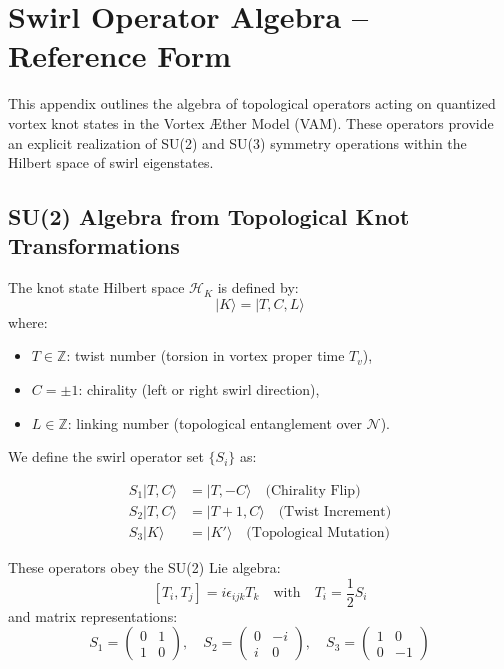 \documentclass[preprint]{revtex4-2}
\begin{document}
        \section{Swirl Operator Algebra – Reference Form}\label{sec:swirl_operator_algebra}
            This appendix outlines the algebra of topological operators acting on quantized vortex knot states in the Vortex \AE{}ther Model (VAM). These operators provide an explicit realization of SU(2) and SU(3) symmetry operations within the Hilbert space of swirl eigenstates.
        
            \subsection{SU(2) Algebra from Topological Knot Transformations}
        
            The knot state Hilbert space \( \mathcal{H}_K \) is defined by:
            \[
            |K\rangle = |T, C, L\rangle
            \]
            where:
            \begin{itemize}
                \item \( T \in \mathbb{Z} \): twist number (torsion in vortex proper time \( T_v \)),
                \item \( C = \pm 1 \): chirality (left or right swirl direction),
                \item \( L \in \mathbb{Z} \): linking number (topological entanglement over \( \mathcal{N} \)).
            \end{itemize}
        
            We define the swirl operator set \( \{S_i\} \) as:
        
            \begin{align}
            S_1 |T, C\rangle &= |T, -C\rangle \quad \text{(Chirality Flip)} \\
            S_2 |T, C\rangle &= |T+1, C\rangle \quad \text{(Twist Increment)} \\
            S_3 |K\rangle &= |K'\rangle \quad \text{(Topological Mutation)}
            \end{align}
        
            These operators obey the SU(2) Lie algebra:
            \[
            [T_i, T_j] = i \epsilon_{ijk} T_k \quad \text{with} \quad T_i = \frac{1}{2} S_i
            \]
            and matrix representations:
            \[
            S_1 = \begin{pmatrix} 0 & 1 \\ 1 & 0 \end{pmatrix}, \quad
            S_2 = \begin{pmatrix} 0 & -i \\ i & 0 \end{pmatrix}, \quad
            S_3 = \begin{pmatrix} 1 & 0 \\ 0 & -1 \end{pmatrix}
            \]
        
\end{document}
